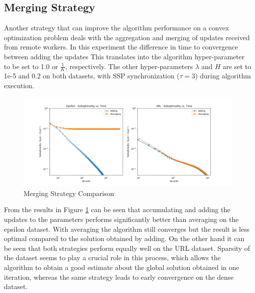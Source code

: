\subsection{Merging Strategy}
\label{ss:merging_strategy}
Another strategy that can improve the algorithm performance on a convex optimization problem deals with the aggregation and merging of updates received from remote workers.
In this experiment the difference in time to convergence between adding the updates
This translates into the algorithm hyper-parameter to be set to 1.0 or $\frac{1}{K}$, respectively.
The other hyper-parameters $\lambda$ and $H$ are set to 1e-5 and 0.2 on both datasets, with SSP synchronization ($\tau=3$) during algorithm execution.
\begin{figure}[ht]
\centering
\includegraphics[width=1.0\textwidth]{img/merg_strat_cmp.png}
\caption{Merging Strategy Comparison}
\label{fig:merg_strat_cmp}
\end{figure}
From the results in Figure \ref{fig:merg_strat_cmp} can be seen that accumulating and adding the updates to the parameters performs significantly better than averaging on the epsilon dataset.
With averaging the algorithm still converges but the result is less optimal compared to the solution obtained by adding.
On the other hand it can be seen that both strategies perform equally well on the URL dataset.
Sparsity of the dataset seems to play a crucial role in this process, which allows the algorithm to obtain a good estimate about the global solution obtained in one iteration, whereas the same strategy leads to early convergence on the dense dataset.

